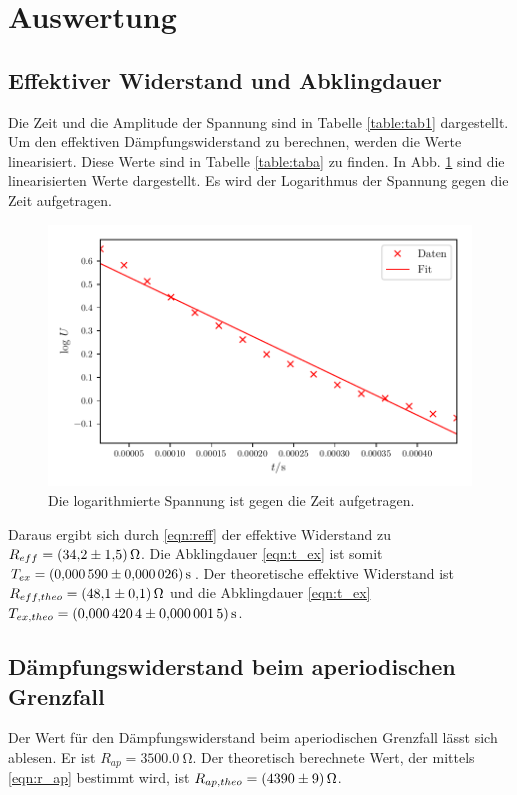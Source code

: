 \section{Auswertung}
\label{sec:Auswertung}

\subsection{Effektiver Widerstand und Abklingdauer} 
Die Zeit und die Amplitude der Spannung sind in Tabelle
\ref{table:tab1} dargestellt. Um den effektiven Dämpfungswiderstand
zu berechnen, werden die Werte linearisiert. Diese Werte sind in
Tabelle \ref{table:taba} zu finden. In Abb. \ref{fig:plota}
sind die linearisierten Werte dargestellt. Es wird der
Logarithmus der Spannung gegen die Zeit aufgetragen.


\begin{figure}
  \centering
  \includegraphics{build/plota.pdf}
  \caption{Die logarithmierte Spannung ist gegen die Zeit aufgetragen.} %
  \label{fig:plota}
\end{figure}
\noindent Daraus ergibt sich durch \eqref{eqn:reff} %
der effektive Widerstand zu $R_{eff} = \SI{34.2 \pm 1.5}{\ohm}$.
Die Abklingdauer \ref{eqn:t_ex} ist somit $T_{ex} = \SI{0.000590 \pm 0.000026}{\second}$.
\newline
Der theoretische effektive Widerstand ist $R_{eff,theo} = \SI{48.1 \pm 0.1}{\ohm}$ %
und die Abklingdauer \eqref{eqn:t_ex} $T_{ex,theo} = \SI{0.0004204 \pm 0.0000015}{\second}$. %

\subsection{Dämpfungswiderstand beim aperiodischen Grenzfall}
Der Wert für den Dämpfungswiderstand beim aperiodischen Grenzfall
lässt sich ablesen. Er ist $R_{ap} = \SI{3500.0}{\ohm}$.
\newline
Der theoretisch berechnete Wert, der mittels \eqref{eqn:r_ap}
bestimmt wird, ist $R_{ap,theo} = \SI{4390 \pm 9}{\ohm}$.

